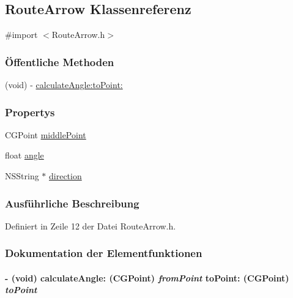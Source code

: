 \hypertarget{interface_route_arrow}{
\subsection{RouteArrow Klassenreferenz}
\label{interface_route_arrow}
}


{\ttfamily \#import $<$RouteArrow.h$>$}\subsubsection*{Öffentliche Methoden}
\begin{DoxyCompactItemize}
\item 
(void) -\/ \hyperlink{interface_route_arrow_a65c0bd1cfc1696590d3fa9f69fd51ea6}{calculateAngle:toPoint:}
\end{DoxyCompactItemize}
\subsubsection*{Propertys}
\begin{DoxyCompactItemize}
\item 
CGPoint \hyperlink{interface_route_arrow_a0f958b0fee2afdfcbb7bae201a914c7c}{middlePoint}
\item 
float \hyperlink{interface_route_arrow_a0cb54129ee3e72c2bac68f7086c38594}{angle}
\item 
NSString $\ast$ \hyperlink{interface_route_arrow_a6d5a8acfc1336e1f72fd2632d1155494}{direction}
\end{DoxyCompactItemize}


\subsubsection{Ausführliche Beschreibung}


Definiert in Zeile 12 der Datei RouteArrow.h.

\subsubsection{Dokumentation der Elementfunktionen}
\hypertarget{interface_route_arrow_a65c0bd1cfc1696590d3fa9f69fd51ea6}{
\paragraph[{calculateAngle:toPoint:}]{\setlength{\rightskip}{0pt plus 5cm}-\/ (void) calculateAngle: (CGPoint) {\em fromPoint}\/ toPoint: (CGPoint) {\em toPoint}}\hfill}
\label{interface_route_arrow_a65c0bd1cfc1696590d3fa9f69fd51ea6}


